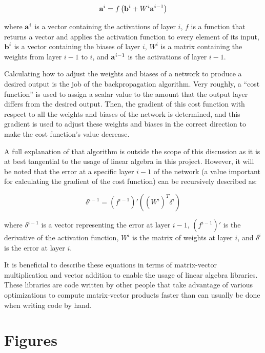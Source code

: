 \documentclass[12pt]{article}
\newcommand{\bi}[1]{\mbox{\textbf{#1}}}
\begin{document}
\[
\bi{a}^i = f\left(\bi{b}^i + W^i\bi{a}^{i-1}\right)
\]

where $\bi{a}^i$ is a vector containing the activations of layer $i$, $f$ is a function that returns a vector and applies the activation function to every element of its input, $\bi{b}^i$ is a vector containing the biases of layer $i$, $W^i$ is a matrix containing the weights from layer $i - 1$ to $i$, and $\bi{a}^{i-1}$ is the activations of layer $i - 1$.

Calculating how to adjust the weights and biases of a network to produce a desired output is the job of the backpropagation algorithm.
Very roughly, a ``cost function'' is used to assign a scalar value to the amount that the output layer differs from the desired output.
Then, the gradient of this cost function with respect to all the weights and biases of the network is determined, and this gradient is used to adjust these weights and biases in the correct direction to make the cost function's value decrease.

A full explanation of that algorithm is outside the scope of this discussion as it is at best tangential to the usage of linear algebra in this project.
However, it will be noted that the error at a specific layer $i-1$ of the network (a value important for calculating the gradient of the cost function) can be recursively described as:

\[
\delta^{i-1} = (f^{i-1})'\left(\left(W^i\right)^T\delta^i\right)
\]

where $\delta^{i-1}$ is a vector representing the error at layer $i - 1$, $(f^{i-1})'$ is the derivative of the activation function, $W^i$ is the matrix of weights at layer $i$, and $\delta^i$ is the error at layer $i$.

\bigskip

It is beneficial to describe these equations in terms of matrix-vector multiplication and vector addition to enable the usage of linear algebra libraries.
These libraries are code written by other people that take advantage of various optimizations to compute matrix-vector products faster than can usually be done when writing code by hand.

\section{Figures}
\end{document}

